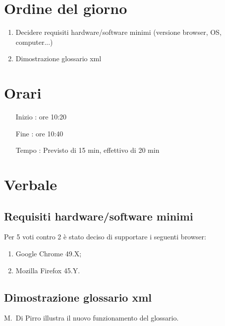 \documentclass[11pt]{meetingmins}
\begin{document}
\maketitle

\section{Ordine del giorno}

\begin{enumerate}

  \item Decidere requisiti hardware/software minimi (versione browser, OS, computer...)
  \item Dimostrazione glossario xml 

\end{enumerate}

\section{Orari}

\begin{itemize}
\item[Inizio]: ore 10:20
\item[Fine]: ore 10:40
\item[Tempo]: Previsto di 15 min, effettivo di 20 min

\end{itemize}

\section{Verbale}

\subsection{Requisiti hardware/software minimi}

Per 5 voti contro 2 è stato deciso di supportare i seguenti browser:
\begin{enumerate}
\item Google Chrome 49.X;
\item Mozilla Firefox 45.Y.
\end{enumerate}

\subsection{Dimostrazione glossario xml}

M.~Di Pirro illustra il nuovo funzionamento del glossario.

\end{document}
